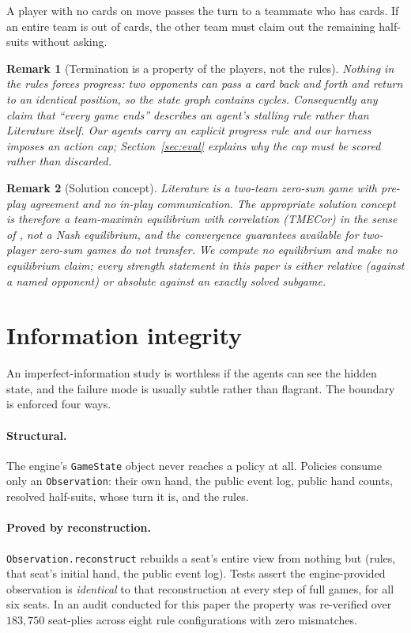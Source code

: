 \documentclass[11pt,a4paper]{article}
\newtheorem{remark}{Remark}
\begin{document}
A player with no cards on move passes the turn to a teammate who has cards. If
an entire team is out of cards, the other team must claim out the remaining
half-suits without asking.

\begin{remark}[Termination is a property of the players, not the rules]
Nothing in the rules forces progress: two opponents can pass a card back and
forth and return to an identical position, so the state graph contains cycles.
Consequently any claim that ``every game ends'' describes an agent's stalling
rule rather than Literature itself. Our agents carry an explicit progress rule
and our harness imposes an action cap; Section~\ref{sec:eval} explains why the
cap must be \emph{scored} rather than discarded.
\end{remark}

\begin{remark}[Solution concept]
Literature is a two-team zero-sum game with pre-play agreement and no in-play
communication. The appropriate solution concept is therefore a team-maximin
equilibrium with correlation (TMECor) in the sense of
\citet{celli2018computational}, not a Nash equilibrium, and the convergence
guarantees available for two-player zero-sum games do not transfer. We compute
no equilibrium and make no equilibrium claim; every strength statement in this
paper is either relative (against a named opponent) or absolute against an
exactly solved subgame.
\end{remark}

\section{Information integrity}
\label{sec:integrity}

An imperfect-information study is worthless if the agents can see the hidden
state, and the failure mode is usually subtle rather than flagrant. The
boundary is enforced four ways.

\paragraph{Structural.} The engine's \texttt{GameState} object never reaches a
policy at all. Policies consume only an \texttt{Observation}: their own hand,
the public event log, public hand counts, resolved half-suits, whose turn it
is, and the rules.

\paragraph{Proved by reconstruction.} \texttt{Observation.reconstruct} rebuilds
a seat's entire view from nothing but (rules, that seat's initial hand, the
public event log). Tests assert the engine-provided observation is
\emph{identical} to that reconstruction at every step of full games, for all
six seats. In an audit conducted for this paper the property was re-verified
over $183{,}750$ seat-plies across eight rule configurations with zero
mismatches.
\end{document}

